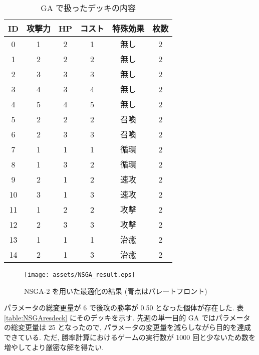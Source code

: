 \documentclass{jarticle}     %
\begin{document}
\begin{table}[h]
  \centering
  \caption{ GA で扱ったデッキの内容}
  \label{table:GAdeck}
  \begin{tabular}{|c|c|c|c|c|c|}
  \hline
  ID & 攻撃力 & HP & コスト & 特殊効果 & 枚数 \\ \hline
  0 & 1 & 2 & 1 & 無し & 2 \\ \hline
  1 & 2 & 2 & 2 & 無し & 2 \\ \hline
  2 & 3 & 3 & 3 & 無し & 2 \\ \hline
  3 & 4 & 3 & 4 & 無し & 2 \\ \hline
  4 & 5 & 4 & 5 & 無し & 2 \\ \hline
  5 & 2 & 2 & 2 & 召喚 & 2 \\ \hline
  6 & 2 & 3 & 3 & 召喚 & 2 \\ \hline
  7 & 1 & 1 & 1 & 循環 & 2 \\ \hline
  8 & 1 & 3 & 2 & 循環 & 2 \\ \hline
  9 & 2 & 1 & 2 & 速攻 & 2 \\ \hline
  10 & 3 & 1 & 3 & 速攻 & 2 \\ \hline
  11 & 1 & 2 & 2 & 攻撃 & 2 \\ \hline
  12 & 2 & 3 & 3 & 攻撃 & 2 \\ \hline
  13 & 1 & 1 & 1 & 治癒 & 2 \\ \hline
  14 & 2 & 1 & 3 & 治癒 & 2 \\ \hline
  \end{tabular}
  \end{table}

  \begin{figure}[t]
    \centering
    \small
    \texttt{[image: assets/NSGA\_result.eps]}
    \caption{NSGA-2 を用いた最適化の結果 (青点はパレートフロント)}
    \label{fig:DQNresult}
  \end{figure}

  パラメータの総変更量が 6 で後攻の勝率が 0.50 となった個体が存在した. 表 \ref{table:NSGAresdeck} にそのデッキを示す. 先週の単一目的 GA ではパラメータの総変更量は 25 となったので, パラメータの変更量を減らしながら目的を達成できている. ただ, 勝率計算におけるゲームの実行数が 1000 回と少ないため数を増やしてより厳密な解を得たい.
\end{document}
